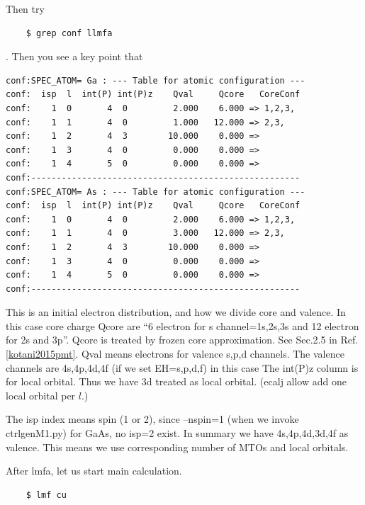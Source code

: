 \documentclass[a4paper,10pt,epsf,fleqn]{article}
\begin{document}
Then try
\begin{verbatim}
    $ grep conf llmfa
\end{verbatim}
. Then you see a key point that
\begin{verbatim}
conf:SPEC_ATOM= Ga : --- Table for atomic configuration ---
conf:  isp  l  int(P) int(P)z    Qval     Qcore   CoreConf
conf:    1  0       4  0         2.000    6.000 => 1,2,3,
conf:    1  1       4  0         1.000   12.000 => 2,3,
conf:    1  2       4  3        10.000    0.000 => 
conf:    1  3       4  0         0.000    0.000 => 
conf:    1  4       5  0         0.000    0.000 => 
conf:-----------------------------------------------------
conf:SPEC_ATOM= As : --- Table for atomic configuration ---
conf:  isp  l  int(P) int(P)z    Qval     Qcore   CoreConf
conf:    1  0       4  0         2.000    6.000 => 1,2,3,
conf:    1  1       4  0         3.000   12.000 => 2,3,
conf:    1  2       4  3        10.000    0.000 => 
conf:    1  3       4  0         0.000    0.000 => 
conf:    1  4       5  0         0.000    0.000 => 
conf:-----------------------------------------------------
\end{verbatim}
This is an initial electron distribution, and how we divide 
core and valence. 
In this case core charge Qcore are ``6 electron for s channel=1s,2s,3s
and 12 electron for 2s and 3p''. 
Qcore is treated by frozen core approximation.
See Sec.2.5 in Ref.\ref{kotani2015pmt}.
Qval means electrons for valence s,p,d channels.
The valence channels are 4s,4p,4d,4f (if we set EH=s,p,d,f) in this case
The int(P)z column is for local orbital. Thus we have 3d treated as
local orbital. (ecalj allow add one local orbital per $l$.)

The isp index means spin (1 or 2), 
since --nspin=1 (when we invoke ctrlgenM1.py) for GaAs, no isp=2 exist.
In summary we have 4s,4p,4d,3d,4f as valence. 
This means we use corresponding number of MTOs and local orbitals.

After lmfa, let us start main calculation.
\begin{verbatim}
    $ lmf cu
\end{verbatim}
\end{document}
